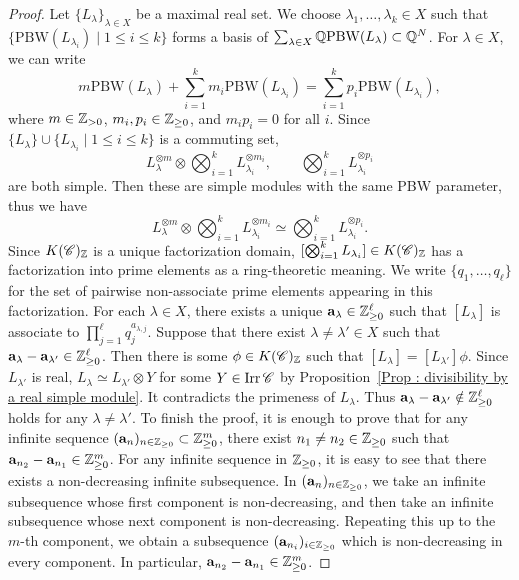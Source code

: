 \begin{proof}
Let $\{L_\lambda\}_{\lambda \in X}$ be a maximal real set.
We choose $\lambda_1, \ldots, \lambda_k \in X$ such that
$\{\mathrm{PBW}(L_{\lambda_i}) \mid 1 \leq i \leq k\}$
forms a basis of
$\sum_{\lambda \in X}\mathbb{Q}\mathrm{PBW}(L_\lambda) \subset \mathbb{Q}^N$.
For $\lambda \in X$, we can write
\[
m\mathrm{PBW}(L_\lambda)
+ \sum_{i=1}^k m_i\mathrm{PBW}(L_{\lambda_i})
= \sum_{i=1}^k p_i\mathrm{PBW}(L_{\lambda_i}),
\]
where $m \in \mathbb{Z}_{>0}$, $m_i, p_i \in \mathbb{Z}_{\geq 0}$,
and $m_i p_i = 0$ for all $i$.
Since $\{L_\lambda\} \cup \{L_{\lambda_i} \mid 1 \leq i \leq k\}$
is a commuting set,
\[
L_\lambda^{\otimes m}
\otimes \bigotimes_{i=1}^k L_{\lambda_i}^{\otimes m_i},
\qquad
\bigotimes_{i=1}^k L_{\lambda_i}^{\otimes p_i}
\]
are both simple.
Then these are simple modules with the same PBW parameter,
thus we have
\begin{equation}
\label{eq : PBW relation in a maximal real set}
L_\lambda^{\otimes m}
\otimes \bigotimes_{i=1}^k L_{\lambda_i}^{\otimes m_i}
\simeq \bigotimes_{i=1}^k L_{\lambda_i}^{\otimes p_i}.
\end{equation}
Since $K(\mathscr{C})_{\mathbb{Z}}$ is a unique factorization domain,
$[\bigotimes_{i=1}^k L_{\lambda_i}] \in K(\mathscr{C})_{\mathbb{Z}}$
has a factorization into prime elements as a ring-theoretic meaning.
We write $\{q_1, \ldots, q_\ell\}$ for the set of pairwise
non-associate prime elements appearing in this factorization.
For each $\lambda \in X$, there exists a unique
$\mathbf{a}_\lambda \in \mathbb{Z}_{\geq 0}^{\ell}$ such that
$[L_\lambda]$ is associate to
$\prod_{j=1}^{\ell}q_j^{a_{\lambda, j}}$.
Suppose that there exist $\lambda \neq \lambda' \in X$ such that
$\mathbf{a}_\lambda - \mathbf{a}_{\lambda'}
\in \mathbb{Z}_{\geq 0}^{\ell}$.
Then there is some $\phi \in K(\mathscr{C})_{\mathbb{Z}}$ such that
$[L_\lambda] = [L_{\lambda'}]\phi$.
Since $L_{\lambda'}$ is real,
$L_\lambda \simeq L_{\lambda'} \otimes Y$
for some $Y \in \mathop{\mathrm{Irr}}\nolimits\mathscr{C}$
by Proposition~\ref{Prop : divisibility by a real simple module}.
It contradicts the primeness of $L_\lambda$.
Thus $\mathbf{a}_\lambda - \mathbf{a}_{\lambda'} \notin \mathbb{Z}_{\geq 0}^{\ell}$ 
holds for any $\lambda \neq \lambda'$.
To finish the proof, it is enough to prove that
for any infinite sequence
$(\mathbf{a}_n)_{n \in \mathbb{Z}_{\geq 0}} \subset \mathbb{Z}_{\geq 0}^m$,
there exist $n_1 \neq n_2 \in \mathbb{Z}_{\geq 0}$ such that
$\mathbf{a}_{n_2} - \mathbf{a}_{n_1} \in \mathbb{Z}_{\geq 0}^m$.
For any infinite sequence in $\mathbb{Z}_{\geq 0}$,
it is easy to see that there exists a non-decreasing infinite subsequence.
In $(\mathbf{a}_n)_{n \in \mathbb{Z}_{\geq 0}}$,
we take an infinite subsequence whose first component is non-decreasing,
and then take an infinite subsequence whose next component
is non-decreasing.
Repeating this up to the $m$-th component, we obtain a subsequence
$(\mathbf{a}_{n_i})_{i \in \mathbb{Z}_{\geq 0}}$
which is non-decreasing in every component.
In particular,
$\mathbf{a}_{n_2} - \mathbf{a}_{n_1} \in \mathbb{Z}_{\geq 0}^m$.
\end{proof}


